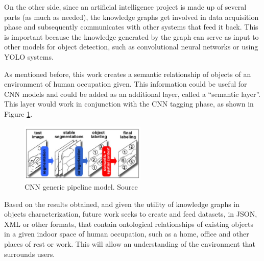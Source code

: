 On the other side, since an artificial intelligence project is made up of 
several parts (as much as needed), the knowledge graphs get involved in 
data acquisition phase and subsequently communicates with other 
systems that feed it back. This is important because the knowledge generated by 
the graph can serve as input to other models for object detection, such as 
convolutional neural networks or using YOLO systems.

As mentioned before, this work creates a semantic relationship of objects of an 
environment of human occupation given. This information could be useful for 
CNN models and could be added as an additional layer, called a 
``semantic layer''. This layer would work in conjunction with the CNN 
tagging phase, as shown in Figure \ref{fig:pipeline}.

\begin{figure}[H]
    \centering
    \includegraphics[width=6cm]{figures/pipeline.png}
    \caption{CNN generic pipeline model. Source \cite{Galleguillos2}}
    \label{fig:pipeline}
\end{figure}


Based on the results obtained, and given the utility of knowledge graphs 
in objects characterization, future work seeks to create and feed 
datasets, in JSON, XML or other formats, that contain ontological relationships 
of existing objects in a given indoor space of human occupation, such as a home, 
office and other places of rest or work. This will allow an understanding of 
the environment that surrounds users.

